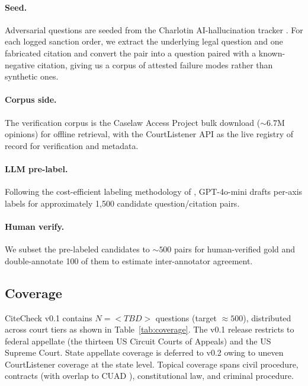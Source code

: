 \documentclass[11pt]{article}
\begin{document}
\paragraph{Seed.}
Adversarial questions are seeded from the Charlotin AI-hallucination
tracker \citep{charlotin2025tracker}. For each logged sanction order,
we extract the underlying legal question and one fabricated citation
and convert the pair into a question paired with a known-negative
citation, giving us a corpus of attested failure modes rather than
synthetic ones.

\paragraph{Corpus side.}
The verification corpus is the Caselaw Access Project bulk download
\citep{cap2018} (${\sim}6.7$M opinions) for offline retrieval, with
the CourtListener API \citep{courtlistener} as the live registry of
record for verification and metadata.

\paragraph{LLM pre-label.}
Following the cost-efficient labeling methodology of
\citet{gray2024llmlabeling}, GPT-4o-mini drafts per-axis labels for
approximately 1,500 candidate question/citation pairs.

\paragraph{Human verify.}
We subset the pre-labeled candidates to ${\sim}500$ pairs for
human-verified gold and double-annotate 100 of them to estimate
inter-annotator agreement.

\subsection{Coverage}
\label{sec:benchmark:coverage}

CiteCheck v0.1 contains $N = <TBD>$ questions (target $\approx 500$),
distributed across court tiers as shown in Table~\ref{tab:coverage}.
The v0.1 release restricts to federal appellate (the thirteen US
Circuit Courts of Appeals) and the US Supreme Court. State appellate
coverage is deferred to v0.2 owing to uneven CourtListener coverage at
the state level. Topical coverage spans civil procedure, contracts
(with overlap to CUAD \citep{hendrycks2021cuad}), constitutional law,
and criminal procedure.
\end{document}
